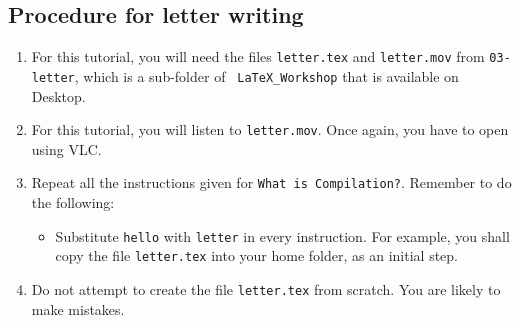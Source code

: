 \documentclass[11pt]{article}
\newenvironment{enumcpt}{\begin{enumerate} \topsep 0pt \partopsep 0pt 
                        \parsep 0pt
                        \itemsep 0pt \leftmargin -1in \rightmargin 0pt
                        }{\end{enumerate}}
\begin{document}
\begin{multicols}{2}
\section{Procedure for letter writing}
\begin{enumcpt}
\item For this tutorial, you will need the files {\tt letter.tex} and
  {\tt letter.mov} from {\tt 03-letter}, which is a sub-folder of {\tt
    LaTeX\_Workshop} that is available on Desktop.
\item For this tutorial, you will listen to {\tt letter.mov}.  Once
  again, you have to open using VLC.  
\item Repeat all the instructions given for {\tt What is
    Compilation?}.  Remember to do the following:
\begin{itemize}
\item Substitute {\tt hello} with {\tt letter} in every instruction.
  For example, you shall copy the file {\tt letter.tex} into your home
  folder, as an initial step.
  \end{itemize}
\item Do not attempt to create the file {\tt letter.tex} from
  scratch.  You are likely to make mistakes.
\end{enumcpt}


\end{multicols}
\end{document}
